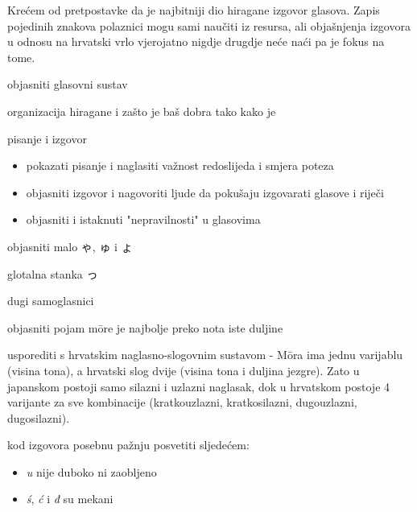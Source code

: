 
\author{autor}

	
	Krećem od pretpostavke da je najbitniji dio hiragane izgovor glasova. Zapis pojedinih znakova polaznici mogu sami naučiti iz resursa, ali objašnjenja izgovora u odnosu na hrvatski vrlo vjerojatno nigdje drugdje neće naći pa je fokus na tome.
	
	
	\begin{hyou}
		\item objasniti glasovni sustav
		\item organizacija hiragane i zašto je baš dobra tako kako je
		\item pisanje i izgovor
		\begin{itemize}
			\itemsep-5pt
			\item pokazati pisanje i naglasiti važnost redoslijeda i smjera poteza
			\item objasniti izgovor i nagovoriti ljude da pokušaju izgovarati glasove i riječi
			\item objasniti i istaknuti "nepravilnosti" u glasovima
		\end{itemize}
		\item objasniti malo ゃ, ゅ i ょ
		\item glotalna stanka っ
		\item dugi samoglasnici
	\end{hyou}

	\fukudai{Napomene}
	
	\begin{hyou}
		\item objasniti pojam m\={o}re je najbolje preko nota iste duljine
		\item usporediti s hrvatskim naglasno-slogovnim sustavom - M\={o}ra ima jednu varijablu (visina tona), a hrvatski slog dvije (visina tona i duljina jezgre). Zato u japanskom postoji samo silazni i uzlazni naglasak, dok u hrvatskom postoje 4 varijante za sve kombinacije (kratkouzlazni, kratkosilazni, dugouzlazni, dugosilazni).
		\item kod izgovora posebnu pažnju posvetiti sljedećem:
		\begin{itemize}
			\itemsep-5pt
			\item \textit{u} nije duboko ni zaobljeno
			\item \textit{\'{s}}, \textit{ć} i \textit{đ} su mekani
		\end{itemize}
	\end{hyou}
